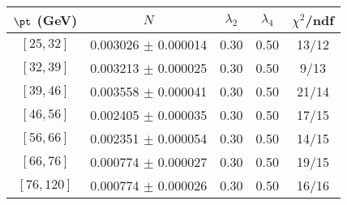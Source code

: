 \begin{tabular}{c||c|c|c|c}
$\pt$ (GeV) & $N$ & $\lambda_{2}$ & $\lambda_4$  & $\chi^2$/ndf  \\
\hline
$[25, 32]$ & 0.003026 $\pm$ 0.000014 & 0.30 & 0.50 & 13/12\\
$[32, 39]$ & 0.003213 $\pm$ 0.000025 & 0.30 & 0.50 & 9/13\\
$[39, 46]$ & 0.003558 $\pm$ 0.000041 & 0.30 & 0.50 & 21/14\\
$[46, 56]$ & 0.002405 $\pm$ 0.000035 & 0.30 & 0.50 & 17/15\\
$[56, 66]$ & 0.002351 $\pm$ 0.000054 & 0.30 & 0.50 & 14/15\\
$[66, 76]$ & 0.000774 $\pm$ 0.000027 & 0.30 & 0.50 & 19/15\\
$[76, 120]$ & 0.000774 $\pm$ 0.000026 & 0.30 & 0.50 & 16/16\\
\end{tabular}
